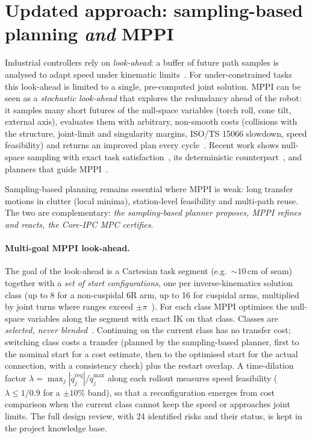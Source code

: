\documentclass[10pt,a4paper]{article}
\begin{document}
\section{Updated approach: sampling-based planning \emph{and} MPPI}
Industrial controllers rely on \emph{look-ahead}: a buffer of future path samples is analysed to adapt speed under kinematic limits~\cite{lange2016pathaccurate}. For under-constrained tasks this look-ahead is limited to a single, pre-computed joint solution. MPPI can be seen as a \emph{stochastic look-ahead} that explores the redundancy ahead of the robot: it samples many short futures of the null-space variables (torch roll, cone tilt, external axis), evaluates them with arbitrary, non-smooth costs (collisions with the structure, joint-limit and singularity margins, ISO/TS 15066 slowdown, speed feasibility) and returns an improved plan every cycle~\cite{williams2018tro}. Recent work shows null-space sampling with exact task satisfaction~\cite{wang2024constrainedpi,lee2026prmppi}, its deterministic counterpart~\cite{sun2024nullspacempc}, and planners that guide MPPI~\cite{tao2023rrtmppi,trevisan2024biasedmppi}.

Sampling-based planning remains essential where MPPI is weak: long transfer motions in clutter (local minima), station-level feasibility and multi-path reuse. The two are complementary: \emph{the sampling-based planner proposes, MPPI refines and reacts, the Core-IPC MPC certifies}.

\paragraph{Multi-goal MPPI look-ahead.} The goal of the look-ahead is a Cartesian task segment (e.g.\ ${\sim}10$\,cm of seam) together with a \emph{set of start configurations}, one per inverse-kinematics solution class (up to 8 for a non-cuspidal 6R arm, up to 16 for cuspidal arms, multiplied by joint turns where ranges exceed $\pm\pi$~\cite{elias2025cuspidal}). For each class MPPI optimises the null-space variables along the segment with exact IK on that class. Classes are \emph{selected, never blended}~\cite{liu2026clusteringmppi,wang2026mppiem}. Continuing on the current class has no transfer cost; switching class costs a transfer (planned by the sampling-based planner, first to the nominal start for a cost estimate, then to the optimised start for the actual connection, with a consistency check) plus the restart overlap. A time-dilation factor $\lambda=\max_j |\dot q_j^{\mathrm{req}}|/\dot q_j^{\max}$ along each rollout measures speed feasibility ($\lambda\le 1/0.9$ for a $\pm10\%$ band), so that a reconfiguration emerges from cost comparison when the current class cannot keep the speed or approaches joint limits. The full design review, with 24 identified risks and their status, is kept in the project knowledge base.
\end{document}
